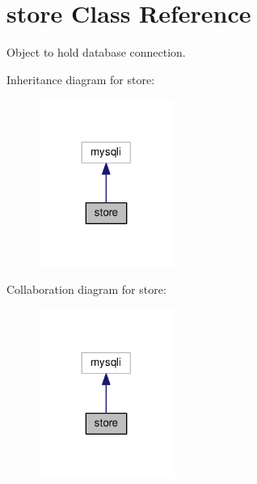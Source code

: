 \hypertarget{classstore}{\section{store Class Reference}
\label{classstore}
}


Object to hold database connection.  




Inheritance diagram for store\-:\nopagebreak
\begin{figure}[H]
\begin{center}
\leavevmode
\includegraphics[width=125pt]{classstore__inherit__graph}
\end{center}
\end{figure}


Collaboration diagram for store\-:\nopagebreak
\begin{figure}[H]
\begin{center}
\leavevmode
\includegraphics[width=125pt]{classstore__coll__graph}
\end{center}
\end{figure}

